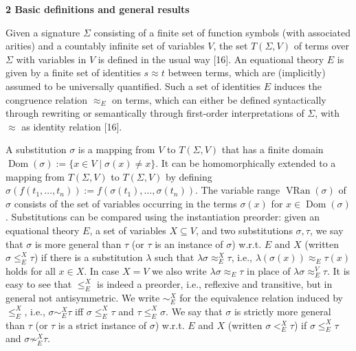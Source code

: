
 
\par\medskip\noindent\textbf{2 Basic definitions and general results}\par
 
 
Given a signature $\Sigma$ consisting of a finite set of function symbols (with associated arities) and a countably infinite set of variables $V$, the set $T(\Sigma,V)$ of terms over $\Sigma$ with variables in $V$ is defined in the usual way [16]. An equational theory $E$ is given by a finite set of identities $s\approx t$ between terms, which are (implicitly) assumed to be universally quantified. Such a set of identities $E$ induces the congruence relation $\approx_{E}$ on terms, which can either be defined syntactically through rewriting or semantically through first-order interpretations of $\Sigma$, with $\approx$ as identity relation [16].\par
 
 
 
A substitution $\sigma$ is a mapping from $V$ to $T(\Sigma,V)$ that has a finite domain $\operatorname{Dom}(\sigma):=\{x\in V\mid\sigma(x)\neq x\}$. It can be homomorphically extended to a mapping from $T(\Sigma,V)$ to $T(\Sigma,V)$ by defining $\sigma(f(t_{1},\ldots,t_{n})):=f(\sigma(t_{1}),\ldots,\sigma(t_{n}))$. The variable range $\operatorname{VRan}(\sigma)$ of $\sigma$ consists of the set of variables occurring in the terms $\sigma(x)$ for $x\in\operatorname{Dom}(\sigma)$. Substitutions can be compared using the instantiation preorder: given an equational theory $E$, a set of variables $X\subseteq V$, and two substitutions $\sigma,\tau$, we say that $\sigma$ is more general than $\tau$ (or $\tau$ is an instance of $\sigma$) w.r.t. $E$ and $X$ (written $\sigma\leq_{E}^{X}\tau$) if there is a substitution $\lambda$ such that $\lambda\sigma\approx_{E}^{X}\tau$, i.e., $\lambda(\sigma(x))\approx_{E}\tau(x)$ holds for all $x\in X$. In case $X=V$ we also write $\lambda\sigma\approx_{E}\tau$ in place of $\lambda\sigma\approx_{E}^{V}\tau$. It is easy to see that $\leq_{E}^{X}$ is indeed a preorder, i.e., reflexive and transitive, but in general not antisymmetric. We write $\sim_{E}^{X}$ for the equivalence relation induced by $\leq_{E}^{X}$, i.e., $\sigma\sim_{E}^{X}\tau$ iff $\sigma\leq^{X}_{E}\tau$ and $\tau\leq^{X}_{E}\sigma$. We say that $\sigma$ is strictly more general than $\tau$ (or $\tau$ is a strict instance of $\sigma$) w.r.t. $E$ and $X$ (written $\sigma<_{E}^{X}\tau$) if $\sigma\leq_{E}^{X}\tau$ and $\sigma\not\sim_{E}^{X}\tau$.\par
 
